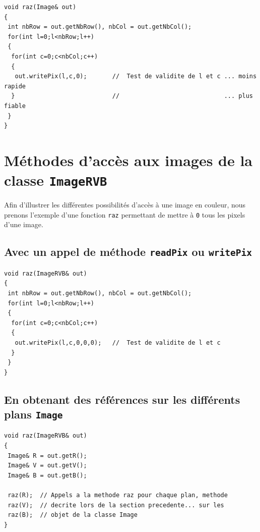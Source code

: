\documentclass[12pt]{article}
\begin{document}
\begin{footnotesize}
\begin{verbatim}
void raz(Image& out)
{
 int nbRow = out.getNbRow(), nbCol = out.getNbCol();
 for(int l=0;l<nbRow;l++)
 {
  for(int c=0;c<nbCol;c++)
  {
   out.writePix(l,c,0);       //  Test de validite de l et c ... moins rapide
  }                           //                             ... plus fiable
 }
}
\end{verbatim}
\end{footnotesize}

\section{M\'ethodes d'acc\`es aux images de la classe {\tt ImageRVB}}

Afin d'illustrer les diff\'erentes possibilit\'es d'acc\`es \`a
une image en couleur, nous prenons l'exemple d'une fonction {\tt raz}
permettant de mettre \`a {\tt 0} tous les pixels d'une image.

\subsection{Avec un appel de m\'ethode {\tt readPix} ou {\tt writePix}}

\begin{footnotesize}
\begin{verbatim}
void raz(ImageRVB& out)
{
 int nbRow = out.getNbRow(), nbCol = out.getNbCol();
 for(int l=0;l<nbRow;l++)
 {
  for(int c=0;c<nbCol;c++)
  {
   out.writePix(l,c,0,0,0);   //  Test de validite de l et c
  }
 }
}
\end{verbatim}
\end{footnotesize}

\subsection{En obtenant des r\'ef\'erences sur les diff\'erents
plans {\tt Image}}

\begin{footnotesize}
\begin{verbatim}
void raz(ImageRVB& out)
{
 Image& R = out.getR();
 Image& V = out.getV();
 Image& B = out.getB();

 raz(R);  // Appels a la methode raz pour chaque plan, methode
 raz(V);  // decrite lors de la section precedente... sur les
 raz(B);  // objet de la classe Image
}
\end{verbatim}
\end{footnotesize}
\end{document}
